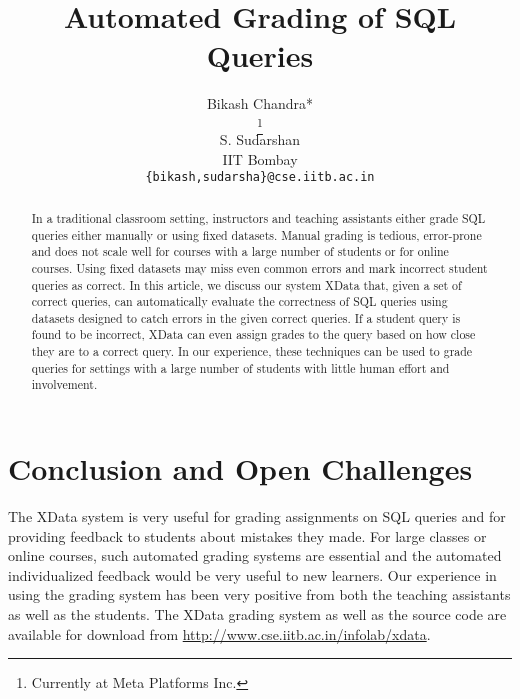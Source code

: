 \documentclass[11pt]{article}
\newcommand\blfootnote[1]{%
  \begin{NoHyper}%
  \renewcommand\thefootnote{}\footnote{#1}%
  \addtocounter{footnote}{-1}%
  \end{NoHyper}%
}
\begin{document}
\title{Automated Grading of SQL Queries}
\author{Bikash Chandra*\blfootnote{Currently at Meta Platforms Inc.} \hspace{1cm} S. Sudarshan \\ IIT Bombay \\ \texttt{\{bikash,sudarsha\}@cse.iitb.ac.in}}
\maketitle

\begin{abstract}
In a traditional classroom setting, instructors and teaching assistants either grade SQL queries either manually or using fixed datasets. Manual grading is tedious, error-prone and does not scale well for courses with a large number of students or for online courses. Using fixed datasets may miss even common errors and mark incorrect student queries as correct. In this article, we discuss our system XData that, given a set of correct queries, can automatically evaluate the correctness of SQL queries using datasets designed to catch errors in the given correct queries. If a student query is found to be incorrect, XData can even assign grades to the query based on how close they are to a correct query. In our experience, these techniques can be used to grade queries for settings with a large number of students with little human effort and involvement. 
\end{abstract}







\section{Conclusion and Open Challenges}
\label{sec:conclusion}
The XData system is very useful for grading assignments on SQL queries and for providing feedback to students about mistakes they made. For large classes or online courses, such automated grading systems are essential and the automated individualized feedback would be very useful to new learners. Our experience in using the grading system has been very positive from both the teaching assistants as well as the students. The XData grading system as well as the  source code
are available for download from {\url{http://www.cse.iitb.ac.in/infolab/xdata}}.
\end{document}
